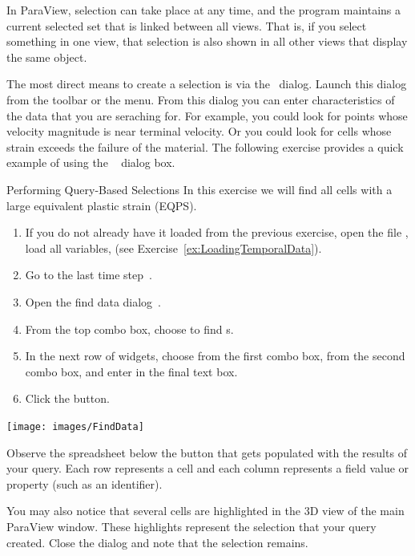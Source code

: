 In ParaView, selection can take place at any time, and the program
maintains a current selected set that is linked between all views.
That is, if you select something in one view, that selection is also
shown in all other views that display the same object.

The most direct means to create a selection is via the ~\findData dialog. Launch this dialog from the toolbar or the
 menu.  From this dialog you can enter characteristics of the
data that you are seraching for.  For example, you could look for points
whose velocity magnitude is near terminal velocity.  Or you could look for
cells whose strain exceeds the failure of the material.  The following
exercise provides a quick example of using the ~\findData
dialog box.

\begin{exercise}{Performing Query-Based Selections}
  \label{ex:PerformingQueryBasedSelections}%
  In this exercise we will find all cells with a large equivalent plastic
  strain (EQPS).

  \begin{enumerate}
  \item If you do not already have it loaded from the previous exercise,
    open the file , load all variables, \apply (see
    Exercise~\ref{ex:LoadingTemporalData}).
  \item Go to the last time step~\vcrLast.
  \item Open the find data dialog~\findData.
  \item From the top combo box, choose to find s.
  \item In the next row of widgets, choose  from the first combo
    box,  from the second combo box, and enter  in the
    final text box.
  \item Click the  button.
  \end{enumerate}

  \begin{inlinefig}
    \texttt{[image: images/FindData]}
  \end{inlinefig}

  Observe the spreadsheet below the  button that
  gets populated with the results of your query.  Each row represents a
  cell and each column represents a field value or property (such as an
  identifier).

  You may also notice that several cells are highlighted in the 3D view of
  the main ParaView window.  These highlights represent the selection that
  your query created.  Close the  dialog and note that the
  selection remains.
\end{exercise}

